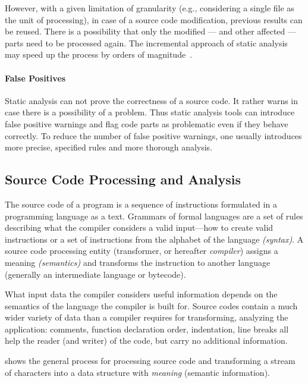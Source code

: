 However, with a given limitation of granularity (e.g., considering a single file as the unit of processing), in case of a source code modification, previous results can be reused. There is a possibility that only the modified --- and other affected --- parts need to be processed again. The incremental approach of static analysis may speed up the process by orders of magnitude~\cite{stein-daniel-bsc}.

\paragraph{False Positives} Static analysis can not prove the correctness of a source code. It rather warns in case there is a possibility of a problem. Thus static analysis tools can introduce false positive warnings and flag code parts as problematic even if they behave correctly. To reduce the number of false positive warnings, one usually introduces more precise, specified rules and more thorough analysis.~\cite{clang}

\subsection{Source Code Processing and Analysis}
\label{sect:source-code-processing}
The source code of a program is a sequence of instructions formulated in a programming language as a text. Grammars of formal languages are a set of rules describing what the compiler considers a valid input---how to create valid instructions or a set of instructions from the alphabet of the language \emph{(syntax)}. A source code processing entity (transformer, or hereafter \emph{compiler}) assigns a meaning \emph{(semantics)} and transforms the instruction to another language (generally an intermediate language or bytecode).~\cite{Aho:1986:CPT:6448}

What input data the compiler considers useful information depends on the semantics of the language the compiler is built for. Source codes contain a much wider variety of data than a compiler requires for transforming, analyzing the application: comments, function declaration order, indentation, line breaks all help the reader (and writer) of the code, but carry no additional information.

 shows the general process for processing source code and transforming a stream of characters into a data structure with \emph{meaning} (semantic information).

